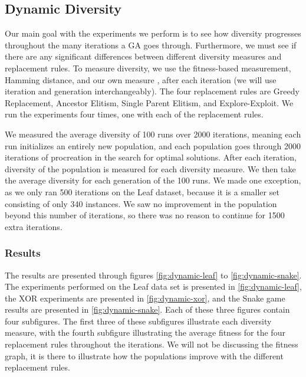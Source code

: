 \subsection{Dynamic Diversity}\label{sec:continuousdiversity}
Our main goal with the experiments we perform is to see how diversity progresses throughout the many iterations a GA goes through. Furthermore, we must see if there are any significant differences between different diversity measures and replacement rules. To measure diversity, we use the fitness-based measurement, Hamming distance, and our own measure \dia, after each iteration (we will use iteration and generation interchangeably). The four replacement rules are Greedy Replacement, Ancestor Elitism, Single Parent Elitism, and Explore-Exploit. We run the experiments four times, one with each of the replacement rules.

We measured the average diversity of \num{100} runs over \num{2000} iterations, meaning each run initializes an entirely new population, and each population goes through \num{2000} iterations of procreation in the search for optimal solutions. After each iteration, diversity of the population is measured for each diversity measure. We then take the average diversity for each generation of the \num{100} runs. We made one exception, as we only ran \num{500} iterations on the Leaf dataset, because it is a smaller set consisting of only \num{340} instances. We saw no improvement in the population beyond this number of iterations, so there was no reason to continue for \num{1500} extra iterations. %


\subsubsection{Results}
The results are presented through figures \ref{fig:dynamic-leaf} to \ref{fig:dynamic-snake}. The experiments performed on the Leaf data set is presented in \cref{fig:dynamic-leaf}, the XOR experiments are presented in \cref{fig:dynamic-xor}, and the Snake game results are presented in \cref{fig:dynamic-snake}. Each of these three figures contain four subfigures. The first three of these subfigures illustrate each diversity measure, with the fourth subfigure illustrating the average fitness for the four replacement rules throughout the iterations. We will not be discussing the fitness graph, it is there to illustrate how the populations improve with the different replacement rules.

